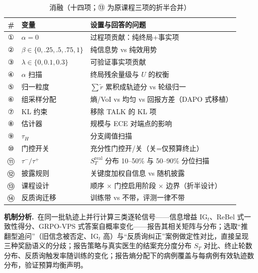 \documentclass[11pt,a4paper]{ctexart}
\newcommand{\1}[1]{\mathbb{1}\!\left[#1\right]}
\newcommand{\IG}{\mathrm{IG}}
\begin{document}
\begin{table}[h]\centering
\caption{消融（十四项；⑬ 为原课程三项的折半合并）}
\label{tab:ablation}
\begin{tabular}{cll}
\toprule
\# & 变量 & 设置与回答的问题 \\
\midrule
① & $\alpha=0$ & 过程项贡献：纯终局+事实项 \\
② & $\beta\in\{0,.25,.5,.75,1\}$ & 纯信息势 vs 纯效用势 \\
③ & $\lambda\in\{0,0.1,0.3\}$ & 可验证事实项贡献 \\
④ & $\alpha$ 扫描 & 终局残余量级与 $U$ 的权衡 \\
⑤ & 归一粒度 & $\sum\tilde r$ 累积成轨迹分 vs 轮级归一 \\
⑥ & 组采样分配 & 熵/VoI vs 均匀 vs 回报方差（DAPO 式移植） \\
⑦ & KL 约束 & 移除 TALK 的 KL 项 \\
⑧ & 估计器 & 规模与 ECE 对端点的影响 \\
⑨ & $\tau_H$ & 分支阈值扫描 \\
⑩ & 门控开关 & 充分性门控开/关（关=仅预算终止） \\
⑪ & $\tau^-/\tau^+$ & $S_T^{\mathrm{real}}$ 分布 10--50\% 与 50--90\% 分位扫描 \\
⑫ & 披露规则 & 关键度加权自信息 vs 随机披露 \\
⑬ & 课程设计 & 顺序 × 门控启用阶段 × 边界（折半设计） \\
⑭ & 反质询迁移 & 训练带 vs 不带，评测一律不带 \\
\bottomrule
\end{tabular}
\end{table}

\textbf{机制分析.}\ 在同一批轨迹上并行计算三类逐轮信号——信息增益 $\IG_t$、ReBel 式一致性得分、GRPO-VPS 式答案自概率变化——报告其相关矩阵与分布；选取``推翻型追问''（旧信念被否定、$\IG_t$ 高）与``反质询纠正''案例做定性对比，直接呈现三种奖励语义的分歧；报告策略与真实医生的结案充分度分布 $S_T$ 对比、终止轮数分布、反质询触发率随训练的变化；报告熵分配下的病例覆盖与每病例有效轨迹数分布，验证预算均衡声明。
\end{document}
